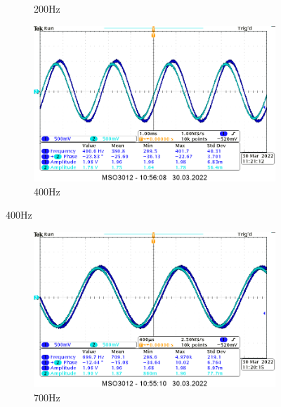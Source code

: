 \begin{itemize}
\begin{figure}[H]
\begin{subfigure}[h]{0.4\textwidth}
                \caption*{200Hz}
            \end{subfigure}
            \begin{subfigure}[h]{0.4\textwidth}
                \includegraphics[width=\textwidth]{img_osciloscope/CLR/CLR_400Hz_cropped.png}
                \caption*{400Hz}
            \end{subfigure}
        \end{figure}
        \begin{figure}[H]
            \centering
            \begin{subfigure}[h]{0.4\textwidth}
                \includegraphics[width=\textwidth]{img_osciloscope/CLR/CLR_700Hz_cropped.png}
                \caption*{700Hz}
            \end{subfigure}
            \begin{subfigure}[h]{0.4\textwidth}

\end{subfigure}
\end{figure}
\end{itemize}
